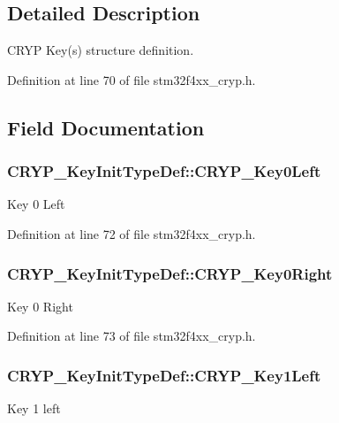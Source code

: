 \subsection{Detailed Description}
C\-R\-Y\-P Key(s) structure definition. 

Definition at line 70 of file stm32f4xx\-\_\-cryp.\-h.



\subsection{Field Documentation}
\hypertarget{struct_c_r_y_p___key_init_type_def_a40168bcf70568a3fbccf282a9a6ef968}{
\subsubsection[{C\-R\-Y\-P\-\_\-\-Key0\-Left}]{ C\-R\-Y\-P\-\_\-\-Key\-Init\-Type\-Def\-::\-C\-R\-Y\-P\-\_\-\-Key0\-Left}}\label{struct_c_r_y_p___key_init_type_def_a40168bcf70568a3fbccf282a9a6ef968}
Key 0 Left 

Definition at line 72 of file stm32f4xx\-\_\-cryp.\-h.

\hypertarget{struct_c_r_y_p___key_init_type_def_a6c570ac1783582c73862aa8a9ec6c10d}{
\subsubsection[{C\-R\-Y\-P\-\_\-\-Key0\-Right}]{ C\-R\-Y\-P\-\_\-\-Key\-Init\-Type\-Def\-::\-C\-R\-Y\-P\-\_\-\-Key0\-Right}}\label{struct_c_r_y_p___key_init_type_def_a6c570ac1783582c73862aa8a9ec6c10d}
Key 0 Right 

Definition at line 73 of file stm32f4xx\-\_\-cryp.\-h.

\hypertarget{struct_c_r_y_p___key_init_type_def_aca352f5af09f7d12e38d95e6c29e03bf}{
\subsubsection[{C\-R\-Y\-P\-\_\-\-Key1\-Left}]{ C\-R\-Y\-P\-\_\-\-Key\-Init\-Type\-Def\-::\-C\-R\-Y\-P\-\_\-\-Key1\-Left}}\label{struct_c_r_y_p___key_init_type_def_aca352f5af09f7d12e38d95e6c29e03bf}
Key 1 left 

